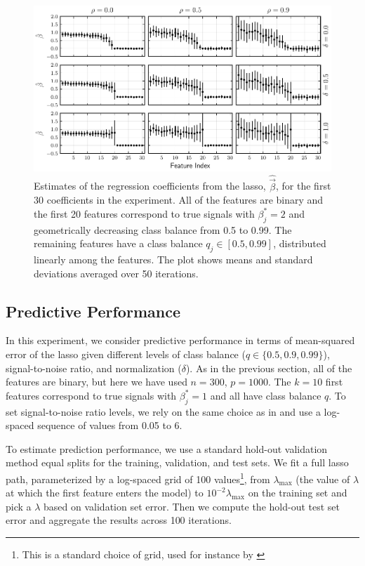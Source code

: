 \begin{figure}[htpb]
  \centering
  \includegraphics[]{plots/binary_decreasing.pdf}
  \caption{%
    Estimates of the regression coefficients from the lasso, \(\hat{\vec{\beta}}\), for the first 30 coefficients in the experiment. All of the features are binary and the first 20 features correspond to true signals with \(\beta_j^* = 2\) and geometrically decreasing class balance from 0.5 to 0.99. The remaining features have a class balance \(q_j \in [0.5, 0.99]\), distributed linearly among the features. The plot shows means and standard deviations averaged over 50 iterations.}
  \label{fig:binary-decreasing}
\end{figure}

\subsection{Predictive Performance}\label{sec:predictive-performance}

In this experiment, we consider predictive performance in terms of mean-squared error of the lasso given different levels of class balance (\(q \in \{0.5, 0.9, 0.99\}\)), signal-to-noise ratio, and normalization (\(\delta\)). As in the previous section, all of the features are binary, but here we have used \(n=300\), \(p = \num{1000}\). The \(k=10\) first features correspond to true signals with \(\beta^*_j = 1\) and all have class balance \(q\). To set signal-to-noise ratio levels, we rely on the same choice as in \citet{hastie2020} and use a log-spaced sequence of values from 0.05 to 6.

To estimate prediction performance, we use a standard hold-out validation method equal splits for the training, validation, and test sets. We fit a full lasso path, parameterized by a log-spaced grid of 100 values\footnote{This is a standard choice of grid, used for instance by \citet{friedman2010}}, from \(\lambda_\text{max}\) (the value of \(\lambda\) at which the first feature enters the model) to \(10^{-2}\lambda_\text{max}\) on the training set and pick a \(\lambda\) based on validation set error. Then we compute the hold-out test set error and aggregate the results across 100 iterations.


